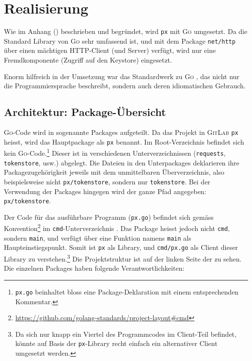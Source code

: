\section{Realisierung}
\label{sec:Realisierung}

Wie im Anhang () beschrieben und begründet, wird \texttt{px} mit \textsc{Go} umgesetzt. Da die Standard Library von \textsc{Go} sehr umfassend ist, und mit dem Package \texttt{net/http} über einen mächtigen HTTP-Client (und Server) verfügt, wird nur eine Fremdkomponente (Zugriff auf den Keystore) eingesetzt.

Enorm hilfreich in der Umsetzung war das Standardwerk zu \textsc{Go} \cite{gopl}, das nicht nur die Programmiersprache beschreibt, sondern auch deren idiomatischen Gebrauch.

\subsection{Architektur: Package-Übersicht}
\label{sec:Architektur-Package-Übersicht}

\textsc{Go}-Code wird in sogenannte Packages aufgeteilt. Da das Projekt in \textsc{GitLab} \texttt{px} heisst, wird das Hauptpackage als \texttt{px} benannt. Im Root-Verzeichnis befindet sich kein \textsc{Go}-Code.\footnote{\texttt{px.go} beinhaltet bloss eine Package-Deklaration mit einem entsprechenden Kommentar.} Dieser ist in verschiedenen Unterverzeichnissen (\texttt{requests}, \texttt{tokenstore}, usw.) abgelegt. Die Dateien in den Unterpackages deklarieren ihre Packagezugehörigkeit jeweils mit dem unmittelbaren Überverzeichnis, also beispielsweise nicht \texttt{px/tokenstore}, sondern nur \texttt{tokenstore}. Bei der Verwendung der Packages hingegen wird der ganze Pfad angegeben: \texttt{px/tokenstore}.

Der Code für das ausführbare Programm (\texttt{px.go}) befindet sich gemäss Konvention\footnote{\url{https://github.com/golang-standards/project-layout\#cmd}} im \texttt{cmd}-Unterverzeichnis \cite[S. 12]{powerful-cli-apps-in-go}. Das Package heisst jedoch nicht \texttt{cmd}, sondern \texttt{main}, und verfügt über eine Funktion namens \texttt{main} als Haupteinstiegspunkt. Somit ist \texttt{px} als Library, und \texttt{cmd/px.go} als Client dieser Library zu verstehen.\footnote{Da sich nur knapp ein Viertel des Programmcodes im Client-Teil befindet, könnte auf Basis der \texttt{px}-Library recht einfach ein alternativer Client umgesetzt werden.} Die Projektstruktur ist auf der linken Seite der  zu sehen. Die einzelnen Packages haben folgende Verantwortlichkeiten:


